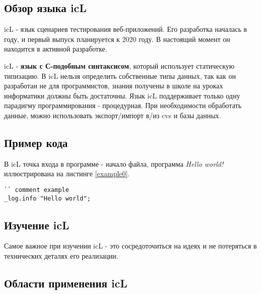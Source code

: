 \documentclass[a4paper, 14pt]{extarticle}
\begin{document}
\subsection{Обзор языка icL}
	
icL - язык сценариев тестирования веб-приложений. Его разработка началась в году, и первый выпуск планируется к 2020 году. В настоящий момент он находится в активной разработке.
	
icL - \textbf{язык с С-подобным синтаксисом}, который использует статическую типизацию. В icL нельзя определить собственные типы данных, так как он разработан не для программистов, знания получены в школе на уроках информатики должны быть достаточны. Язык icL поддерживает только одну парадигму программирования - процедурная. При необходимости обработать данные, можно использовать экспорт/импорт в/из cvs и базы данных.
	
\subsection{Пример кода}

В icL точка входа в программе - начало файла, программа \textit{Hello world!} иллюстрирована на листинге \ref{example0}.
	
\begin{lstlisting}[caption=Пример, label=example0]
`` comment example
_log.info "Hello world";
\end{lstlisting}
  
\subsection{Изучение icL}
	
Самое важное при изучении icL - это сосредоточиться на идеях и не потеряться в технических деталях его реализации.
	
\subsection{Области применения icL}
	
\end{document}
